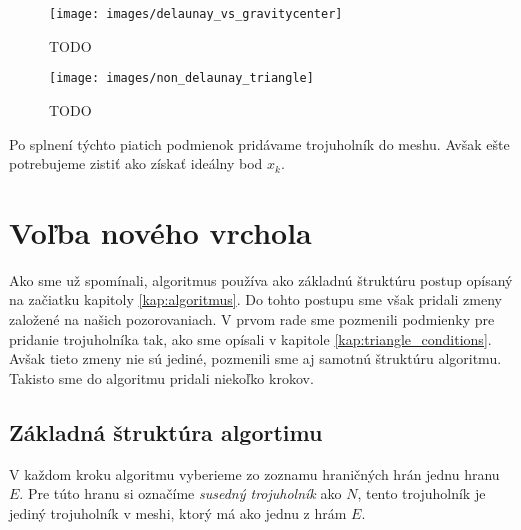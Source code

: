 \begin{enumerate}
    \begin{figure}
        \centerline{\texttt{[image: images/delaunay\_vs\_gravitycenter]}}
        \caption[]{TODO}
        \label{obr:delaunay_vs_gravitycenter}
    \end{figure}

    \begin{figure}
        \centerline{\texttt{[image: images/non\_delaunay\_triangle]}}
        \caption[]{TODO}
        \label{obr:non_delaunay_triangle}
    \end{figure}
\end{enumerate}

Po splnení týchto piatich podmienok pridávame trojuholník do meshu. Avšak ešte potrebujeme zistiť 
ako získať ideálny bod $x_k$.

\section{Voľba nového vrchola}

Ako sme už spomínali, algoritmus používa ako 
základnú štruktúru postup opísaný na začiatku kapitoly \ref{kap:algoritmus}. 
Do tohto postupu sme však pridali zmeny založené na našich pozorovaniach. V prvom rade sme 
pozmenili podmienky pre pridanie trojuholníka tak, ako sme opísali v kapitole 
\ref{kap:triangle_conditions}. Avšak tieto zmeny nie sú jediné, pozmenili sme aj 
samotnú štruktúru algoritmu. Takisto sme do algoritmu pridali niekoľko krokov.

\subsection{Základná štruktúra algortimu}

V každom kroku algoritmu vyberieme zo zoznamu hraničných hrán jednu hranu $E$. Pre túto hranu si 
označíme \textit{susedný trojuholník} ako $N$, tento trojuholník je jediný trojuholník v meshi, 
ktorý má ako jednu z hrám $E$. 

